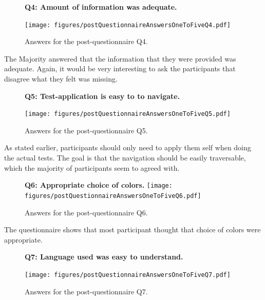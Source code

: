 \documentclass[nofilelist,dvipsnames]{cslthse-msc}
\begin{document}
				\begin{figure}[h!]
          \textbf{Q4: Amount of information was adequate.}
          \begin{center}
            \texttt{[image: figures/postQuestionnaireAnswersOneToFiveQ4.pdf]}
            \vspace{-1cm}
            \caption{Answers for the post-questionnaire Q4.}
          \end{center}
				\end{figure}

        The Majority answered that the information that they were provided was
        adequate. Again, it would be very interesting to ask the participants
        that disagree what they felt was missing.

				\begin{figure}[h!]
          \textbf{Q5: Test-application is easy to to navigate.}
          \begin{center}
            \texttt{[image: figures/postQuestionnaireAnswersOneToFiveQ5.pdf]}
            \vspace{-1cm}
            \caption{Answers for the post-questionnaire Q5.}
          \end{center}
				\end{figure}

        As stated earlier, participants should only need to apply them self
        when doing the actual tests. The goal is that the navigation should be
        easily traversable, which the majority of participants seem to agreed with.

				\begin{figure}[h!]
          \begin{center}
            \textbf{Q6: Appropriate choice of colors.}
            \texttt{[image: figures/postQuestionnaireAnswersOneToFiveQ6.pdf]}
            \vspace{-1cm}
            \caption{Answers for the post-questionnaire Q6.}
          \end{center}
				\end{figure}

        The questionnaire shows that most participant thought that choice of
        colors were appropriate.

				\begin{figure}[h!]
          \textbf{Q7: Language used was easy to understand.}
          \begin{center}
            \texttt{[image: figures/postQuestionnaireAnswersOneToFiveQ7.pdf]}
            \vspace{-1cm}
            \caption{Answers for the post-questionnaire Q7.}
          \end{center}
				\end{figure}
\end{document}
